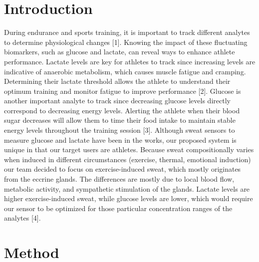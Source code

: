 \documentclass[conference]{IEEEtran}
\begin{document}
\section{Introduction}
During endurance and sports training, it is important to track different analytes to determine physiological changes [1]. Knowing the impact of these fluctuating biomarkers, such as glucose and lactate, can reveal ways to enhance athlete performance. Lactate levels are key for athletes to track since increasing levels are indicative of anaerobic metabolism, which causes muscle fatigue and cramping. Determining their lactate threshold allows the athlete to understand their optimum training and monitor fatigue to improve performance [2]. Glucose is another important analyte to track since decreasing glucose levels directly correspond to decreasing energy levels. Alerting the athlete when their blood sugar decreases will allow them to time their food intake to maintain stable energy levels throughout the training session [3]. 
Although sweat sensors to measure glucose and lactate have been in the works, our proposed system is unique in that our target users are athletes. Because sweat compositionally varies when induced in different circumstances (exercise, thermal, emotional induction) our team decided to focus on exercise-induced sweat, which mostly originates from the eccrine glands.  The differences are mostly due to local blood flow, metabolic activity, and sympathetic stimulation of the glands. Lactate levels are higher exercise-induced sweat, while glucose levels are lower, which would require our sensor to be optimized for those particular concentration ranges of the analytes [4]. 

\bigskip

\section{Method}
\end{document}
